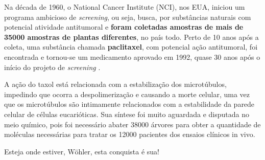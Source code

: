 \documentclass[a4paper,12pt,]{book}
\begin{document}
Na década de 1960, o National Cancer Institute (NCI), nos EUA, iniciou um programa ambicioso de \emph{screening}, ou seja, busca, por substâncias naturais com potencial atividade antitumoral e \textbf{foram coletadas amostras de mais de 35000 amostras de plantas diferentes}, no país todo. Perto de 10 anos após a coleta, uma substância chamada \textbf{paclitaxel}, com potencial ação antitumoral, foi encontrada e tornou-se um medicamento aprovado em 1992, quase 30 anos após o início do projeto de \emph{screening} \cite{paclitaxel}.

A ação do taxol está relacionada com a estabilização dos microtúbulos, impedindo que ocorra a despolimerização e causando a morte celular, uma vez que os microtúbulos são intimamente relacionados com a estabilidade da parede celular de células eucarióticas. Sua síntese foi muito aguardada e disputada no meio químico, pois foi necessário abater 38000 árvores para obter a quantidade de moléculas necessárias para tratar os 12000 pacientes dos ensaios clínicos in vivo.

Esteja onde estiver, Wöhler, esta conquista é sua!











	\backmatter
	
	\printindex
	
	\printbibliography[heading=bibintoc,title={Bibliografia Completa}]
	
\end{document}
